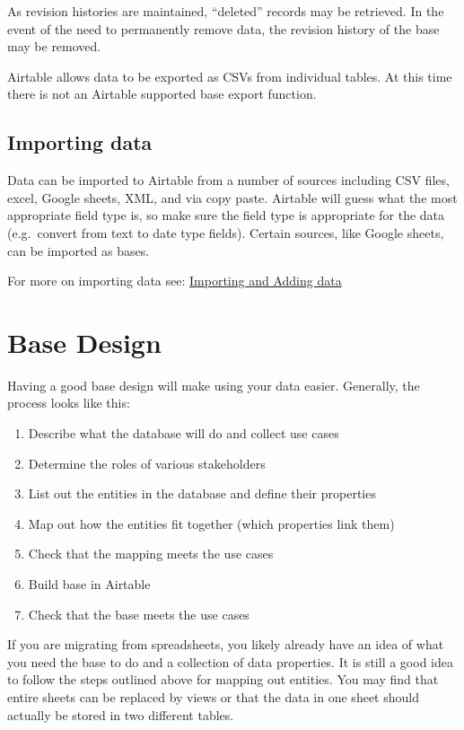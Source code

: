\documentclass[
]{book}
\providecommand{\tightlist}{%
  \setlength{\itemsep}{0pt}\setlength{\parskip}{0pt}}
\begin{document}
As revision histories are maintained, ``deleted'' records may be retrieved. In the event of the need to permanently remove data, the revision history of the base may be removed.

Airtable allows data to be exported as CSVs from individual tables. At this time there is not an Airtable supported base export function.

\hypertarget{importing-data}{%
\subsection{Importing data}\label{importing-data}}

Data can be imported to Airtable from a number of sources including CSV files, excel, Google sheets, XML, and via copy paste. Airtable will guess what the most appropriate field type is, so make sure the field type is appropriate for the data (e.g.~convert from text to date type fields). Certain sources, like Google sheets, can be imported as bases.

For more on importing data see: \href{https://support.airtable.com/hc/en-us/sections/200928025-Importing-and-adding-data}{Importing and Adding data}

\hypertarget{base-design}{%
\section{Base Design}\label{base-design}}

Having a good base design will make using your data easier. Generally, the process looks like this:

\begin{enumerate}
\def\labelenumi{\arabic{enumi})}
\setcounter{enumi}{-1}
\tightlist
\item
  Describe what the database will do and collect use cases
\item
  Determine the roles of various stakeholders
\item
  List out the entities in the database and define their properties
\item
  Map out how the entities fit together (which properties link them)
\item
  Check that the mapping meets the use cases
\item
  Build base in Airtable
\item
  Check that the base meets the use cases
\end{enumerate}

If you are migrating from spreadsheets, you likely already have an idea of what you need the base to do and a collection of data properties. It is still a good idea to follow the steps outlined above for mapping out entities. You may find that entire sheets can be replaced by views or that the data in one sheet should actually be stored in two different tables.
\end{document}
